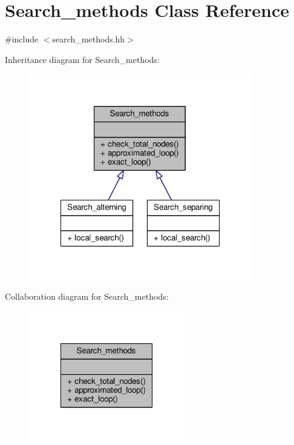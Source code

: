 \hypertarget{classSearch__methods}{\section{Search\-\_\-methods Class Reference}
\label{classSearch__methods}
}


{\ttfamily \#include $<$search\-\_\-methods.\-hh$>$}



Inheritance diagram for Search\-\_\-methods\-:
\nopagebreak
\begin{figure}[H]
\begin{center}
\leavevmode
\includegraphics[width=275pt]{classSearch__methods__inherit__graph}
\end{center}
\end{figure}


Collaboration diagram for Search\-\_\-methods\-:\nopagebreak
\begin{figure}[H]
\begin{center}
\leavevmode
\includegraphics[width=192pt]{classSearch__methods__coll__graph}
\end{center}
\end{figure}
